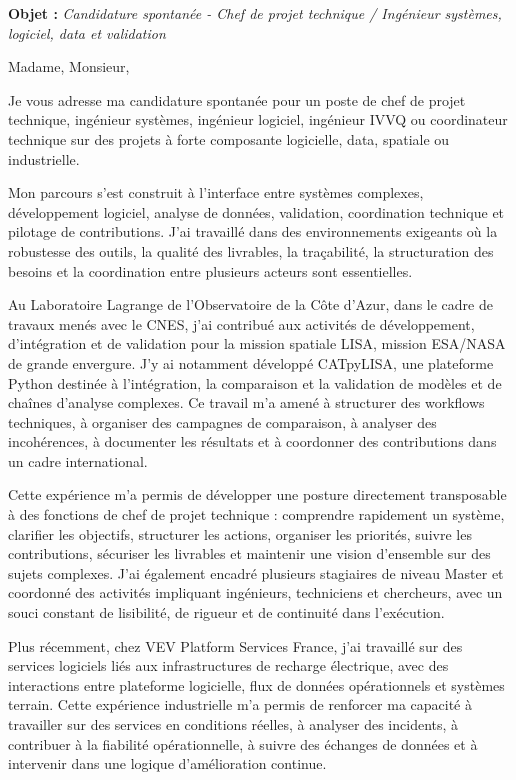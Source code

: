 \documentclass[11pt,a4paper]{../_shared/altacv}
\begin{document}
\makecvheader
\vspace{-0.6cm}

\vspace{-0.4cm}

{\color{accent}\textbf{Objet :}} \textit{Candidature spontanée - Chef de projet technique / Ingénieur systèmes, logiciel, data et validation}

{\color{body}

Madame, Monsieur,

Je vous adresse ma candidature spontanée pour un poste de chef de projet technique, ingénieur systèmes, ingénieur logiciel, ingénieur IVVQ ou coordinateur technique sur des projets à forte composante logicielle, data, spatiale ou industrielle.

Mon parcours s'est construit à l'interface entre systèmes complexes, développement logiciel, analyse de données, validation, coordination technique et pilotage de contributions. J'ai travaillé dans des environnements exigeants où la robustesse des outils, la qualité des livrables, la traçabilité, la structuration des besoins et la coordination entre plusieurs acteurs sont essentielles.

Au Laboratoire Lagrange de l'Observatoire de la Côte d'Azur, dans le cadre de travaux menés avec le CNES, j'ai contribué aux activités de développement, d'intégration et de validation pour la mission spatiale LISA, mission ESA/NASA de grande envergure. J'y ai notamment développé CATpyLISA, une plateforme Python destinée à l'intégration, la comparaison et la validation de modèles et de chaînes d'analyse complexes. Ce travail m'a amené à structurer des workflows techniques, à organiser des campagnes de comparaison, à analyser des incohérences, à documenter les résultats et à coordonner des contributions dans un cadre international.

Cette expérience m'a permis de développer une posture directement transposable à des fonctions de chef de projet technique : comprendre rapidement un système, clarifier les objectifs, structurer les actions, organiser les priorités, suivre les contributions, sécuriser les livrables et maintenir une vision d'ensemble sur des sujets complexes. J'ai également encadré plusieurs stagiaires de niveau Master et coordonné des activités impliquant ingénieurs, techniciens et chercheurs, avec un souci constant de lisibilité, de rigueur et de continuité dans l'exécution.

Plus récemment, chez VEV Platform Services France, j'ai travaillé sur des services logiciels liés aux infrastructures de recharge électrique, avec des interactions entre plateforme logicielle, flux de données opérationnels et systèmes terrain. Cette expérience industrielle m'a permis de renforcer ma capacité à travailler sur des services en conditions réelles, à analyser des incidents, à contribuer à la fiabilité opérationnelle, à suivre des échanges de données et à intervenir dans une logique d'amélioration continue.

}
\end{document}
